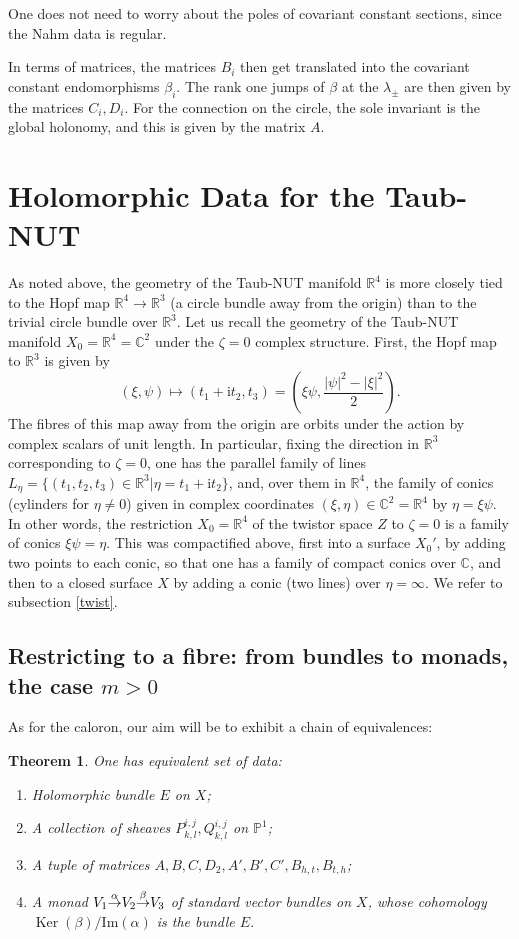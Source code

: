 \documentclass[12pt]{article}
\newtheorem{theorem}{Theorem}[section]
\theoremstyle{definition}
\theoremstyle{remark}
\numberwithin{theorem}{section}
\renewcommand{\i}{\mathrm{i}}
\def\bR{{\mathbb {R}}}
\def\bC{{\mathbb {C}}}
\def\bP{{\mathbb {P}}}
\renewcommand{\ker}{\mathop{\mathrm{Ker}}\nolimits}
\begin{document}
 One does not need to worry about the poles of covariant constant sections, since the Nahm data is regular.

In terms of matrices, the matrices $B_i$ then get translated into the covariant constant endomorphisms $\beta_i$. The rank one jumps of $\beta$ at the $\lambda_\pm$ are then given by the matrices $C_i, D_i$. For the connection on the circle, the sole invariant is the global holonomy, and this is given by the matrix $A$.

\section{Holomorphic Data for the Taub-NUT}

As noted above, the geometry of the Taub-NUT manifold $\bR^4$ is more closely tied to the Hopf map $\bR^4\rightarrow \bR^3$ (a circle bundle away from the origin) than to the trivial circle bundle over $\bR^3$. Let us recall the geometry of the Taub-NUT manifold  $X_0= \bR^4=\bC^2$ under the $\zeta = 0$ complex structure. 
First, the Hopf map to $\bR^3$ is given by 
$$(\xi,\psi)\mapsto (t_1+\i t_2, t_3) = (\xi\psi, \frac{|\psi|^2-|\xi|^2}{2}).$$
The  fibres of this map  away from the origin are orbits under the action by complex scalars of unit length.
In particular, fixing the direction in $\bR^3$ corresponding to $\zeta=0$, one has the parallel family of lines $L_\eta=\{ (t_1,t_2,t_3)\in \bR^3| \eta= t_1+\i t_2\}$, and, over them in $\bR^4$, the family of conics (cylinders for $\eta\neq 0$) given in complex coordinates $(\xi,\eta)\in \bC^2=\bR^4$ by $\eta = \xi\psi.$ In other words, the restriction $X_0 = \bR^4$ of the twistor space $Z$ to  $\zeta = 0$  is a family of conics $\xi \psi=\eta$. This was compactified above, first into a surface $X_0'$, by adding two points to each conic, so that one has a family of compact conics over $\bC$, and then to a closed surface $X$ by adding a conic  (two lines) over $\eta = \infty$. We refer to subsection \ref{twist}.

\subsection{Restricting to a fibre: from bundles to monads, the case $m>0$}
As for the caloron, our aim will be to exhibit a chain of equivalences:

\begin{theorem} One has equivalent set of  data:
\begin{enumerate}
\item Holomorphic bundle $E$ on $X$;
\item A collection of sheaves $P^{i,j}_{k,l}, Q^{i,j}_{k,l}$ on $\bP^1$;
\item  A tuple of matrices $A, B, C, D_2, A',B',C', B_{h,t}, B_{t,h}$;
\item  A monad $ V_1 {\buildrel{\alpha }\over{\rightarrow} }V_2 {\buildrel{\beta}\over{\rightarrow}}  V_3$ of standard vector bundles on $X$, whose cohomology $\ker( \beta)/\mathrm{Im}(\alpha)$ is the bundle $E.$
\end{enumerate}

\end{theorem}
\end{document}
